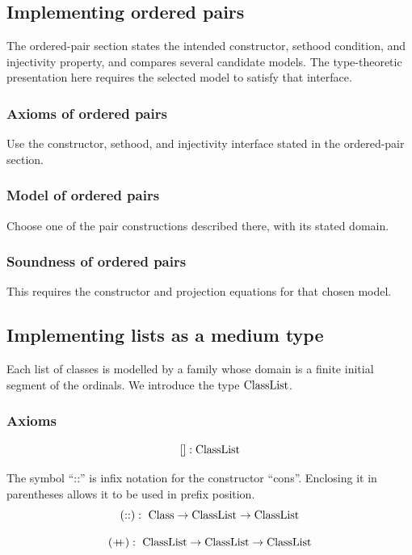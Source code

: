 \pagebreak
\subsection{Implementing ordered pairs}
The ordered-pair section states the intended constructor, sethood
condition, and injectivity property, and compares several candidate
models. The type-theoretic presentation here requires the selected model
to satisfy that interface.
\subsubsection{Axioms of ordered pairs}
Use the constructor, sethood, and injectivity interface stated in the ordered-pair section.
\subsubsection{Model of ordered pairs}
Choose one of the pair constructions described there, with its stated domain.
\subsubsection{Soundness of ordered pairs}
This requires the constructor and projection equations for that chosen model.
\pagebreak

\subsection{Implementing lists as a medium type}
Each list of classes is modelled by a family whose domain is a finite
initial segment of the ordinals. We introduce the type $\mathrm{ClassList}$.
\subsubsection{Axioms}
\begin{axiom}[nil]
\[
[] : \mathrm{ClassList}
\]
\end{axiom}
\begin{axiom}[cons]
The symbol ``::'' is infix notation for the constructor ``cons''.
Enclosing it in parentheses allows it to be used in prefix position.
\[
(::):\ {\text{Class}} \to \mathrm{ClassList} \to \mathrm{ClassList}
\]
\end{axiom}
\begin{axiom}[concat]
\[
(\mathbin{{+}\mspace{-8mu}{+}}):\ \mathrm{ClassList} \to \mathrm{ClassList} \to \mathrm{ClassList}
\]
\end{axiom}
